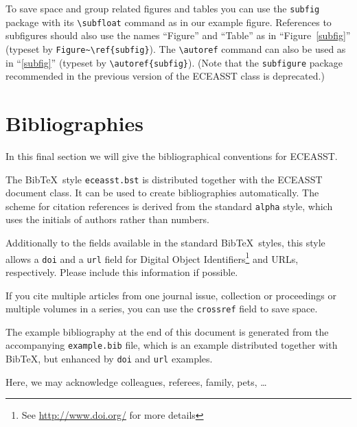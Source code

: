 \documentclass{eceasst}
\begin{document}
To save space and group related figures and tables you can use the
\verb|subfig| package with its \verb|\subfloat| command as in our example
figure.
References to subfigures should also use the names ``Figure'' and ``Table'' as
in ``Figure~\ref{subfig}'' (typeset by \verb|Figure~\ref{subfig}|).
The \verb|\autoref| command can also be used as in ``\autoref{subfig}''
(typeset by \verb|\autoref{subfig}|).
(Note that the \verb|subfigure| package recommended in the previous version
of the ECEASST class is deprecated.)

\section{Bibliographies}
In this final section we will give the bibliographical conventions for
ECEASST.

The Bib\TeX\ style \verb|eceasst.bst| is distributed together with the ECEASST
document class.
It can be used to create bibliographies automatically.
The scheme for citation references is derived from the standard \verb|alpha|
style, which uses the initials of authors rather than numbers.

Additionally to the fields available in the standard Bib\TeX\ styles, this style
allows a \verb|doi| and a \verb|url| field for Digital Object
Identifiers\footnote{See \url{http://www.doi.org/} for more details} and URLs,
respectively.
Please include this information if possible.

If you cite multiple articles from one journal issue, collection or proceedings
or multiple volumes in a series, you can use the \verb|crossref| field to save
space.

The example bibliography at the end of this document is generated from the
accompanying \verb|example.bib| file, which is an example distributed together
with Bib\TeX, but enhanced by \verb|doi| and \verb|url| examples.



\begin{acknowledge}
Here, we may acknowledge colleagues, referees, family, pets, \dots
\end{acknowledge}

\nocite{*}


\end{document}
